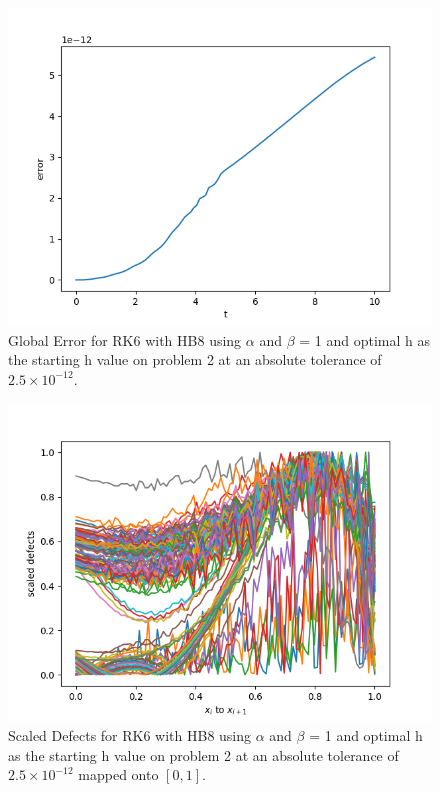 \begin{figure}[H]
\centering
\includegraphics[width=0.7\linewidth]{./figures/sharp_tolerance_rk6_with_hb8_p2_global_error}
\caption{Global Error for RK6 with HB8 using $\alpha$ and $\beta$ = 1 and optimal h as the starting h value on problem 2 at an absolute tolerance of $2.5 \times 10^{-12}$.}
\label{fig:sharp_tolerance_rk6_with_hb8_p2_global_error}
\end{figure}

\begin{figure}[H]
\centering
\includegraphics[width=0.7\linewidth]{./figures/sharp_tolerance_rk6_with_hb8_p2_scaled_defects}
\caption{Scaled Defects for RK6 with HB8 using $\alpha$ and $\beta$ = 1 and optimal h as the starting h value on problem 2 at an absolute tolerance of $2.5 \times 10^{-12}$ mapped onto $[0, 1]$.}
\label{fig:sharp_tolerance_rk6_with_hb8_p2_scaled_defects}
\end{figure}

